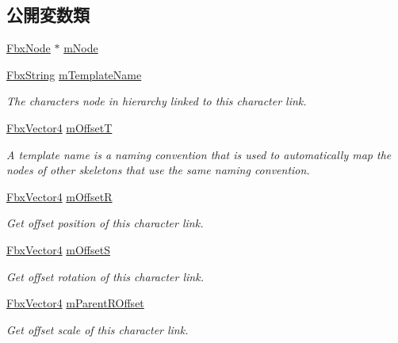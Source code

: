 \subsection*{公開変数類}
\begin{DoxyCompactItemize}
\item 
\hyperlink{class_fbx_node}{Fbx\+Node} $\ast$ \hyperlink{class_fbx_character_link_a1f8cdbd468b8bdb070ada229984c094e}{m\+Node}
\item 
\hyperlink{class_fbx_string}{Fbx\+String} \hyperlink{class_fbx_character_link_a57e20720f9a533670e5b003f9a3d05f2}{m\+Template\+Name}
\begin{DoxyCompactList}\small\item\em The character\textquotesingle{}s node in hierarchy linked to this character link. \end{DoxyCompactList}\item 
\hyperlink{class_fbx_vector4}{Fbx\+Vector4} \hyperlink{class_fbx_character_link_a3baf29ae4a06587d77e8a8ac9fef225d}{m\+OffsetT}
\begin{DoxyCompactList}\small\item\em A template name is a naming convention that is used to automatically map the nodes of other skeletons that use the same naming convention. \end{DoxyCompactList}\item 
\hyperlink{class_fbx_vector4}{Fbx\+Vector4} \hyperlink{class_fbx_character_link_aab8ab2a895523dce65a76ea68a732960}{m\+OffsetR}
\begin{DoxyCompactList}\small\item\em Get offset position of this character link. \end{DoxyCompactList}\item 
\hyperlink{class_fbx_vector4}{Fbx\+Vector4} \hyperlink{class_fbx_character_link_acf71e4b7ea7b661ec5efa22a090e0a18}{m\+OffsetS}
\begin{DoxyCompactList}\small\item\em Get offset rotation of this character link. \end{DoxyCompactList}\item 
\hyperlink{class_fbx_vector4}{Fbx\+Vector4} \hyperlink{class_fbx_character_link_a82c5bd03f0927e100bd8ee6315cd5db0}{m\+Parent\+R\+Offset}
\begin{DoxyCompactList}\small\item\em Get offset scale of this character link. \end{DoxyCompactList}\item 

\end{DoxyCompactItemize}
